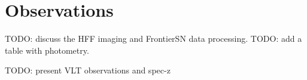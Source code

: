 \section{Observations}\label{sec:Observations}

TODO: discuss the HFF imaging and FrontierSN data processing. 
TODO: add a table with photometry.

TODO: present VLT observations and spec-z


  
  
